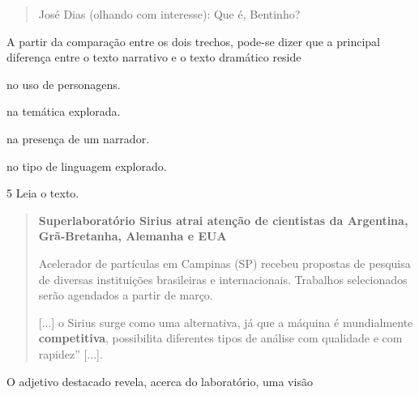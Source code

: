 \begin{quote}
José Dias (olhando com interesse): Que é, Bentinho?

\end{quote}

A partir da comparação entre os dois trechos, pode-se dizer que a
principal diferença entre o texto narrativo e o texto dramático reside

\begin{minipage}{.5\textwidth}
\begin{escolha}
\item no uso de personagens.

\item na temática explorada.

\item na presença de um narrador.

\item no tipo de linguagem explorado.
\end{escolha}
\end{minipage}

\num{5} Leia o texto.

\begin{quote}
\textbf{Superlaboratório Sirius atrai atenção de cientistas da
Argentina, Grã-Bretanha, Alemanha e EUA}

Acelerador de partículas em Campinas (SP) recebeu propostas de
pesquisa de diversas instituições brasileiras e internacionais.
Trabalhos selecionados serão agendados a partir de março.

{[}...{]} o Sirius surge como uma alternativa, já que a máquina é
mundialmente \textbf{competitiva}, possibilita diferentes tipos de
análise com qualidade e com rapidez” {[}...{]}.

\end{quote}

O adjetivo destacado revela, acerca do laboratório, uma visão

